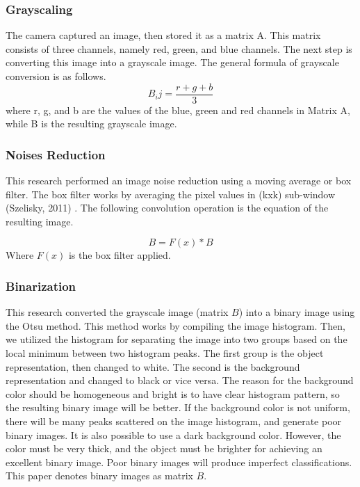 \documentclass[11pt]{article}
\begin{document}
\begin{linenumbers}
\subsubsection{Grayscaling}
The camera captured an image, then stored it as a matrix A. This matrix consists of three channels, namely red, green, and blue channels. The next step is converting this image into a grayscale image. The general formula of grayscale conversion is as follows.
\begin{equation}
	B_ij=\frac{r + g + b}{3}
\end{equation}
where r, g, and b are the values of the blue, green and red channels in Matrix A, while B is the resulting grayscale image.

\subsubsection{Noises Reduction}
This research performed an image noise reduction using a moving average or box filter. The box filter works by averaging the pixel values in (kxk) sub-window (Szelisky, 2011) \cite{Szeliski:2011}. The following convolution operation is the equation of the resulting image.

\begin{equation}
	B = F(x) * B
\end{equation}
Where \(F(x)\) is the box filter applied.

\subsubsection{Binarization}
This research converted the grayscale image (matrix \(B \)) into a binary image using the Otsu method. This method works by compiling the image histogram. Then, we utilized the histogram for separating the image into two groups based on the local minimum between two histogram peaks. The first group is the object representation, then changed to white. The second is the background representation and changed to black or vice versa. The reason for the background color should be homogeneous and bright is to have clear histogram pattern, so the resulting binary image will be better. If the background color is not uniform, there will be many peaks scattered on the image histogram, and generate poor binary images. It is also possible to use a dark background color. However, the color must be very thick, and the object must be brighter for achieving an excellent binary image. Poor binary images will produce imperfect classifications. This paper denotes binary images as matrix \(B \).


\end{linenumbers}
\end{document}
